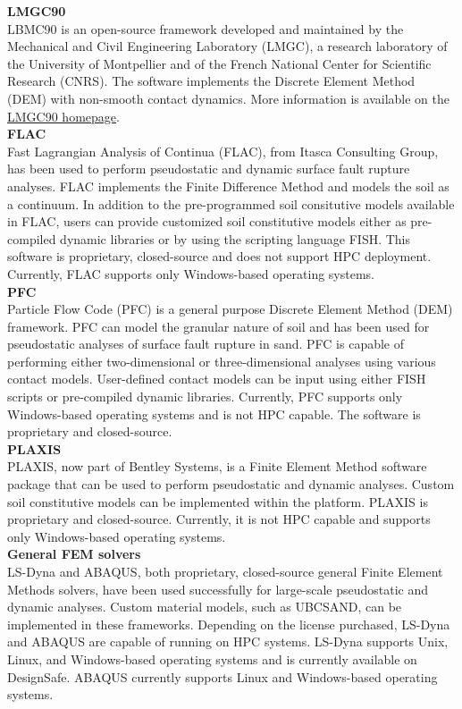 \noindent\textbf{LMGC90}\\
 LBMC90 is an open-source framework developed and maintained by the Mechanical and Civil Engineering Laboratory (LMGC), a research laboratory of the University of Montpellier and of the French National Center for Scientific Research (CNRS). The software implements the Discrete Element Method (DEM) with non-smooth contact dynamics. More information is available on the \href{http://mimetics-engineering.fr/index.php/en/lmgc90-2/}{LMGC90 homepage}.\\

\noindent\textbf{FLAC}\\
Fast Lagrangian Analysis of Continua (FLAC), from Itasca Consulting Group, has been used to perform pseudostatic and dynamic surface fault rupture analyses. FLAC implements the Finite Difference Method and models the soil as a continuum. In addition to the pre-programmed soil consitutive models available in FLAC, users can provide customized soil constitutive models either as pre-compiled dynamic libraries or by using the scripting language FISH. This software is proprietary, closed-source and does not support HPC deployment. Currently, FLAC supports only Windows-based operating systems.\\

\noindent\textbf{PFC}\\
Particle Flow Code (PFC) is a general purpose Discrete Element Method (DEM) framework. PFC can model the granular nature of soil and has been used for pseudostatic analyses of surface fault rupture in sand. PFC is capable of performing either two-dimensional or three-dimensional analyses using various contact models. User-defined contact models can be input using either FISH scripts or pre-compiled dynamic libraries. Currently, PFC supports only Windows-based operating systems and is not HPC capable. The software is proprietary and closed-source.\\

\noindent\textbf{PLAXIS}\\
PLAXIS, now part of Bentley Systems, is a Finite Element Method software package that can be used to perform pseudostatic and dynamic analyses. Custom soil constitutive models can be implemented within the platform. PLAXIS is proprietary and closed-source. Currently, it is not HPC capable and supports only Windows-based operating systems.\\

\noindent\textbf{General FEM solvers}\\
LS-Dyna and ABAQUS, both proprietary, closed-source general Finite Element Methods solvers, have been used successfully for large-scale pseudostatic and dynamic analyses. Custom material models, such as UBCSAND, can be implemented in these frameworks. Depending on the license purchased, LS-Dyna and ABAQUS are capable of running on HPC systems. LS-Dyna supports Unix, Linux, and Windows-based operating systems and is currently available on DesignSafe. ABAQUS currently supports Linux and Windows-based operating systems.


